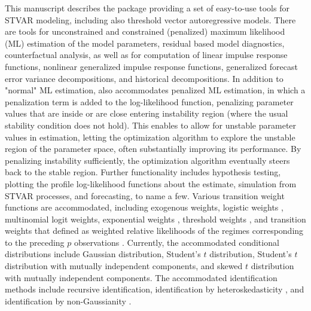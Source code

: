 \documentclass[nojss]{jss}
\begin{document}
This manuscript describes the  package  providing a set of easy-to-use tools for STVAR modeling, including also threshold vector autoregressive models. There are tools for unconstrained and constrained (penalized) maximum likelihood (ML) estimation of the model parameters, residual based model diagnostics, counterfactual analysis, as well as for computation of linear impulse response functions, nonlinear generalized impulse response functions, generalized forecast error variance decompositions, and historical decompositions. In addition to "normal" ML estimation,  also accommodates penalized ML estimation, in which a penalization term is added to the log-likelihood function, penalizing parameter values that are inside or are close entering instability region (where the usual stability condition does not hold). This enables to allow for unstable parameter values in estimation, letting the optimization algorithm to explore the unstable region of the parameter space, often substantially improving its performance. By penalizing instability sufficiently, the optimization algorithm eventually steers back to the stable region. Further functionality includes hypothesis testing, plotting the profile log-likelihood functions about the estimate, simulation from STVAR processes, and forecasting, to name a few. Various transition weight functions are accommodated, including exogenous weights, logistic weights \citep{Anderson+Vahid:1998}, multinomial logit weights, exponential weights \citep[e.g.,][]{Hubrich+Terasvirta:2013}, threshold weights \citep{Tsay:1998}, and transition weights that defined as weighted relative likelihoods of the regimes corresponding to the preceding $p$ observations \citep{Lanne+Virolainen:2024}. Currently, the accommodated conditional distributions include Gaussian distribution, Student's $t$ distribution, Student's $t$ distribution with mutually independent components, and skewed $t$ distribution with mutually independent components. The accommodated identification methods include recursive identification, identification by heteroskedasticity \citep{Lutkepohl+Netsunajev:2017}, and identification by non-Gaussianity \citep{Virolainen2:2024}.
\end{document}
